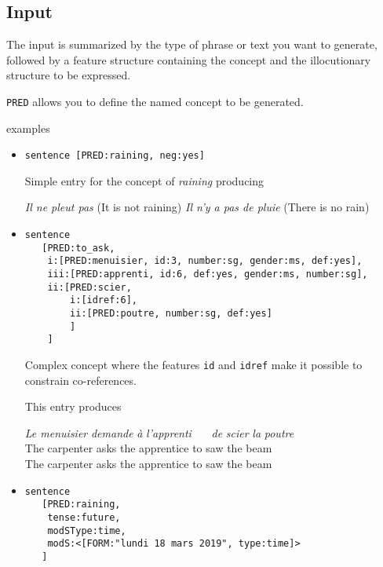 \documentclass[11pt]{article}
\begin{document}
\subsection{Input}

The input is summarized by the type of phrase or text you want to generate, followed by a
feature structure containing the concept and the illocutionary structure to be expressed.


\texttt{PRED} allows you to define the named concept to be generated.

examples

\begin{itemize}
\item 
\begin{verbatim}
sentence [PRED:raining, neg:yes]
\end{verbatim}

Simple entry for the concept of \textit{raining} producing 
\begin{exe}
\ex \begin{xlist} 
\ex \textit{Il ne pleut pas} (It is not raining)
\ex \textit{Il n'y a pas de pluie} (There is no rain)
\end{xlist}
\end{exe}


\item 
\begin{verbatim}
sentence 
   [PRED:to_ask,
    i:[PRED:menuisier, id:3, number:sg, gender:ms, def:yes],
    iii:[PRED:apprenti, id:6, def:yes, gender:ms, number:sg],
    ii:[PRED:scier,
        i:[idref:6],
        ii:[PRED:poutre, number:sg, def:yes]
        ]
    ]
\end{verbatim}

Complex concept where the features \texttt{id} and \texttt{idref}
make it possible to constrain co-references. 

This entry produces 
\begin{exe}
\ex 
\begin{tabbing}
\textit{Le menuisier} \= \textit{demande} \= \textit{à} \textit{l'apprenti}~~~ \= \textit{de} \textit{scier} \= \textit{la} \textit{poutre}\\
The carpenter \> asks \> the apprentice \> to saw \> the beam\\
The carpenter asks the apprentice to saw the
beam
\end{tabbing}
\end{exe}

\item 
\begin{verbatim}
sentence 
   [PRED:raining, 
    tense:future, 
    modSType:time, 
    modS:<[FORM:"lundi 18 mars 2019", type:time]>
   ]
\end{verbatim}


\end{itemize}
\end{document}
